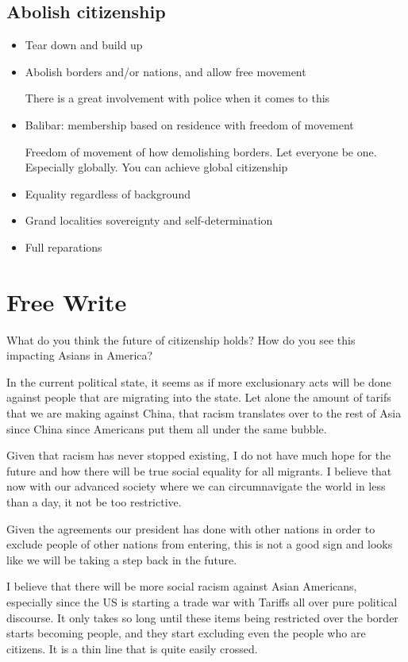 \documentclass{article}
\begin{document}
\subsection{Abolish citizenship}
\begin{itemize}
  \item Tear down and build up
  \item Abolish borders and/or nations, and allow free movement

    There is a great involvement with police when it comes to this
  \item Balibar: membership based on residence with freedom of movement

    Freedom of movement of how demolishing borders. Let everyone
    be one. Especially globally. You can achieve global citizenship
  \item Equality regardless of background
  \item Grand localities sovereignty and self-determination
  \item Full reparations
\end{itemize}

\section*{Free Write}
What do you think the future of citizenship holds? How
do you see this impacting Asians in America?

In the current political state, it seems as if more exclusionary acts
will be done against people that are migrating into the state.
Let alone the amount of tarifs that we are making against China,
that racism translates over to the rest of Asia since China since
Americans put them all under the same bubble.

Given that racism has never stopped existing, I do not have much hope for the future
and how there will be true social equality for all migrants. I believe
that now with our advanced society where we can circumnavigate the world
in less than a day, it not be too restrictive.

Given the agreements our president has done with other nations in order
to exclude people of other nations from entering, this is not a good
sign and looks like we will be taking a step back in the future.

I believe that there will be more social racism against Asian Americans,
especially since the US is starting a trade war with Tariffs all over
pure political discourse. It only takes so long until these items
being restricted over the border starts becoming people, and they
start excluding even the people who are citizens. It is a thin line that is 
quite easily crossed.
\end{document}

